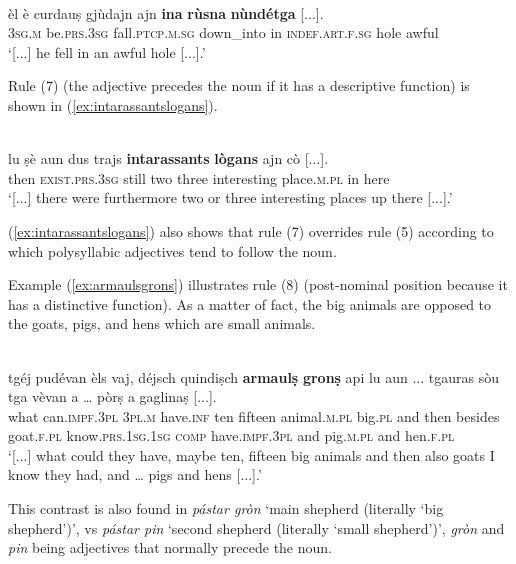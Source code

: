 \ea
\label{ex:rusnanundetga}
\\
\gll  [...] èl è curdauṣ gjùdajn ajn \textbf{ina} \textbf{rùsna} \textbf{nùndétga} [...].  \\
{} \textsc{3sg.m} be.\textsc{prs.3sg} fall.\textsc{ptcp.m.sg} down\_into in \textsc{indef.art.f.sg} hole awful\\
\glt `[...] he fell in an awful hole [...].'
\z

Rule (7) (the adjective precedes the noun if it has a descriptive function) is shown in (\ref{ex:intarassantslogans}).

\ea
\label{ex:intarassantslogans}
\\
\gll [...] lu ṣè aun dus trajs \textbf{intarassants} \textbf{lògans} ajn cò [...].\\
 {} then \textsc{exist.prs.3sg} still two three interesting place.\textsc{m.pl} in here\\
\glt `[...] there were furthermore two or three interesting places up there [...].'
\z

(\ref{ex:intarassantslogans}) also shows that rule (7) overrides rule (5) according to which polysyllabic adjectives tend to follow the noun.

Example (\ref{ex:armaulsgrons}) illustrates rule (8) (post-nominal position because it has a distinctive function). As a matter of fact, the big animals are opposed to the goats, pigs, and hens which are small animals.

\ea
\label{ex:armaulsgrons}
\\
\gll   [...] tgéj pudévan èls vaj, déjsch quindiṣch \textbf{armaulṣ} \textbf{gronṣ} api lu aun ... tgauras sòu tga vèvan a … pòrṣ a gaglinaṣ [...]. \\
[...] what can.\textsc{impf.3pl} \textsc{3pl.m} have.\textsc{inf} ten fifteen animal.\textsc{m.pl} big.\textsc{pl} and then besides {} goat.\textsc{f.pl} know.\textsc{prs.1sg.1sg} \textsc{comp} have.\textsc{impf.3pl} and {} pig.\textsc{m.pl} and hen.\textsc{f.pl}\\
\glt `[...] what could they have, maybe ten, fifteen big animals and then also goats I know they had, and … pigs and hens [...].'
\z

This contrast is also found in \textit{pástar gròn} `main shepherd (literally `big shepherd')', vs \textit{pástar pin} `second shepherd (literally `small shepherd')', \textit{gròn} and \textit{pin} being adjectives that normally precede the noun.


